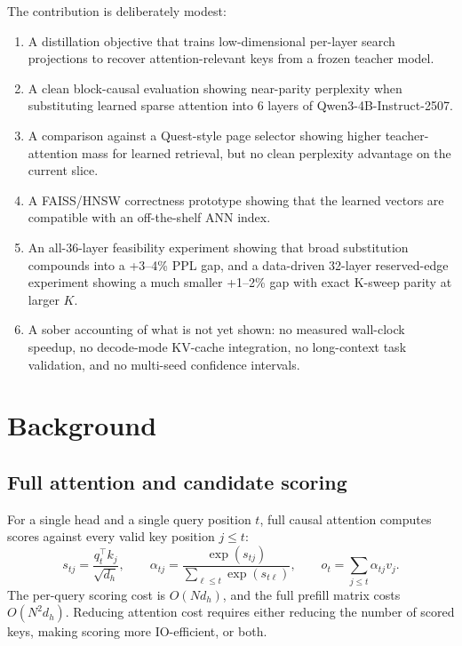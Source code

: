 \documentclass[10pt]{article}
\begin{document}
The contribution is deliberately modest:
\begin{enumerate}
    \item A distillation objective that trains low-dimensional per-layer search
    projections to recover attention-relevant keys from a frozen teacher model.
    \item A clean block-causal evaluation showing near-parity perplexity when
    substituting learned sparse attention into 6 layers of
    Qwen3-4B-Instruct-2507.
    \item A comparison against a Quest-style page selector showing higher
    teacher-attention mass for learned retrieval, but no clean perplexity
    advantage on the current slice.
    \item A FAISS/HNSW correctness prototype showing that the learned vectors
    are compatible with an off-the-shelf ANN index.
    \item An all-36-layer feasibility experiment showing that broad substitution
    compounds into a +3--4\% PPL gap, and a data-driven 32-layer reserved-edge
    experiment showing a much smaller +1--2\% gap with exact K-sweep parity at
    larger $K$.
    \item A sober accounting of what is not yet shown: no measured wall-clock
    speedup, no decode-mode KV-cache integration, no long-context task
    validation, and no multi-seed confidence intervals.
\end{enumerate}

\section{Background}
\subsection{Full attention and candidate scoring}
For a single head and a single query position $t$, full causal attention
computes scores against every valid key position $j\leq t$:
\begin{equation}
    s_{tj}=\frac{q_t^\top k_j}{\sqrt{d_h}},\qquad
    \alpha_{tj}=\frac{\exp(s_{tj})}{\sum_{\ell\leq t}\exp(s_{t\ell})},
    \qquad o_t=\sum_{j\leq t}\alpha_{tj}v_j.
\end{equation}
The per-query scoring cost is $O(Nd_h)$, and the full prefill matrix costs
$O(N^2d_h)$. Reducing attention cost requires either reducing the number of
scored keys, making scoring more IO-efficient, or both.
\end{document}

